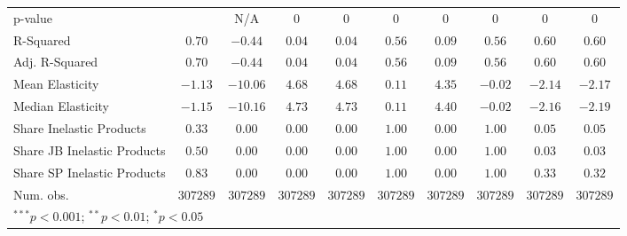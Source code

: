 \begin{tabular}{l c c c c c c c c c}
p-value                     &               & N/A           & 0            & 0            & 0            & 0            & 0            & 0             & 0             \\
R-Squared                   & $0.70$        & $-0.44$       & $0.04$       & $0.04$       & $0.56$       & $0.09$       & $0.56$       & $0.60$        & $0.60$        \\
Adj. R-Squared              & $0.70$        & $-0.44$       & $0.04$       & $0.04$       & $0.56$       & $0.09$       & $0.56$       & $0.60$        & $0.60$        \\
Mean Elasticity             & $-1.13$       & $-10.06$      & $4.68$       & $4.68$       & $0.11$       & $4.35$       & $-0.02$      & $-2.14$       & $-2.17$       \\
Median Elasticity           & $-1.15$       & $-10.16$      & $4.73$       & $4.73$       & $0.11$       & $4.40$       & $-0.02$      & $-2.16$       & $-2.19$       \\
Share Inelastic Products    & $0.33$        & $0.00$        & $0.00$       & $0.00$       & $1.00$       & $0.00$       & $1.00$       & $0.05$        & $0.05$        \\
Share JB Inelastic Products & $0.50$        & $0.00$        & $0.00$       & $0.00$       & $1.00$       & $0.00$       & $1.00$       & $0.03$        & $0.03$        \\
Share SP Inelastic Products & $0.83$        & $0.00$        & $0.00$       & $0.00$       & $1.00$       & $0.00$       & $1.00$       & $0.33$        & $0.32$        \\
Num. obs.                   & $307289$      & $307289$      & $307289$     & $307289$     & $307289$     & $307289$     & $307289$     & $307289$      & $307289$      \\
\bottomrule
\multicolumn{10}{l}{\scriptsize{$^{***}p<0.001$; $^{**}p<0.01$; $^{*}p<0.05$}}
\end{tabular}
